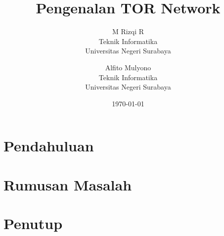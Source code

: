 \documentclass{article}
\title{\LARGE \textbf {\huge{Pengenalan TOR Network}}}
\author{
    M Rizqi R\\
    Teknik Informatika\\
    Universitas Negeri Surabaya\\
    \and
        Alfito Mulyono\\
        Teknik Informatika\\
        Universitas Negeri Surabaya\\
}
\date{\today}
\begin{document}
    \maketitle
    \begin{multicols*}{2}
        \section{Pendahuluan}
        \lipsum[1-2]    
        \section{Rumusan Masalah}
        \lipsum[1-3]
        \section{Penutup}
        \lipsum[1]
    \end{multicols*}
\end{document}
